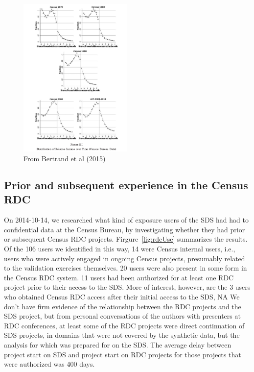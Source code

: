 \documentclass[12pt,titlepage]{article}
\begin{document}
\begin{figure}[hbt]
\centering
\caption{From Bertrand et al (2015)}\label{fig:bertrand-qje-census}
\includegraphics[width=0.5\textwidth]{Bertrand-QJE-2015-FigureIII}
\end{figure}


\subsection{Prior and subsequent experience in the Census RDC}



On 2014-10-14, we researched what kind of exposure users of the \ac{SDS} had had to confidential data at the Census Bureau, by investigating whether they had prior or subsequent Census RDC projects. Firgure~\ref{fig:rdcUse} summarizes the results.
Of the 106 users we identified in this way, 14 were Census internal users, i.e., users who were actively engaged in ongoing Census projects, presumably related to the validation exercises themselves. 
20 users were also present in some form in the Census RDC system. 11 users had been authorized for at least one RDC project prior to their access to the \ac{SDS}. 
More of interest, however, are the 3 users who obtained Census RDC access after their initial access to the \ac{SDS}, 
NA
We don't have firm evidence of the relationship between the RDC projects and the SDS project, but from personal conversations of the authors with presenters at RDC conferences, at least some of the RDC projects were direct continuation of SDS projects, in domains that were not covered by the synthetic data, but the analysis for which was prepared for on the \ac{SDS}. The average delay between project start on \ac{SDS} and project start on RDC projects for those projects that were authorized was 400 days.
\end{document}
